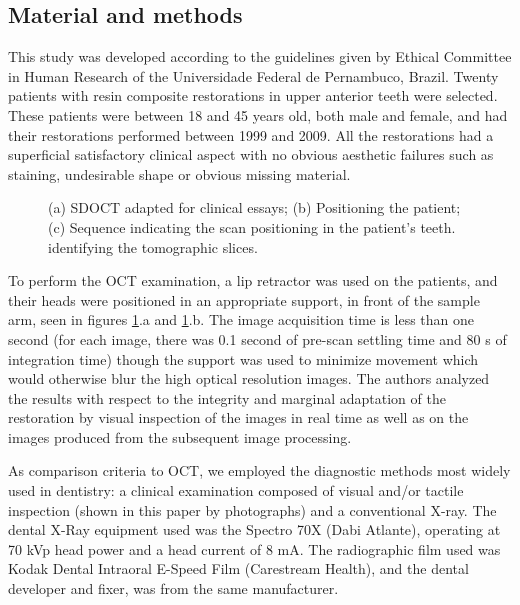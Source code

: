 \documentclass[12pt,twoside,english]{book}
\renewcommand{\~}{\perispomeni}%
\DeclareRobustCommand{\textgreek}[1]{\leavevmode{\greektext #1}}
\numberwithin{equation}{section}
\numberwithin{figure}{section}
\begin{document}
\subsection{Material and methods}

This study was developed according to the guidelines given by Ethical Committee in Human Research of the Universidade Federal de Pernambuco, Brazil. Twenty patients with resin composite restorations in upper anterior teeth were selected. These patients were between 18 and 45 years old, both male and female, and had their restorations performed between 1999 and 2009. All the restorations had a superficial satisfactory clinical aspect with no obvious aesthetic failures such as staining, undesirable shape or obvious missing material.
\begin{figure}[h]
\caption{(a) SDOCT adapted for clinical essays; (b) Positioning the patient; (c) Sequence indicating the scan positioning in the patient's teeth. identifying the tomographic slices.\label{fig:clinical photos}}
\end{figure}
 
To perform the OCT examination, a lip retractor was used on the patients, and their heads were positioned in an appropriate support, in front of the sample arm, seen in figures \ref{fig:clinical photos}.a and \ref{fig:clinical photos}.b. The image acquisition time is less than one second (for each image, there was 0.1 second of pre-scan settling time and 80 \textgreek{m}s of integration time) though the support was used to minimize movement which would otherwise blur the high optical resolution images. The authors analyzed the results with respect to the integrity and marginal adaptation of the restoration by visual inspection of the images in real time as well as on the images produced from the subsequent image processing.

As comparison criteria to OCT, we employed the diagnostic methods most widely used in dentistry: a clinical examination composed of visual and/or tactile inspection (shown in this paper by photographs) and a conventional X-ray. The dental X-Ray equipment used was the Spectro 70X (Dabi Atlante), operating at 70 kVp head power and a head current of 8 mA. The radiographic film used was Kodak Dental Intraoral E-Speed Film (Carestream Health), and the dental developer and fixer, was from the same manufacturer.
\end{document}

